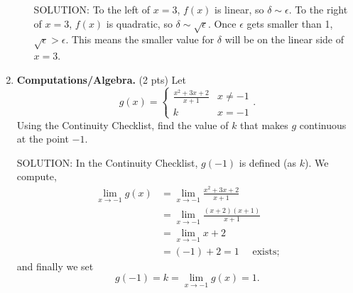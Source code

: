 \documentclass[11pt,letterpaper]{article}
\begin{document}
\begin{enumerate}
\begin{enumerate}
\vspace{0.5pc}
SOLUTION: To the left of $x=3$, $f(x)$ is linear, so $\delta\sim\epsilon$.  To the right of $x=3$, $f(x)$ is quadratic, so $\delta\sim\sqrt\epsilon$.  Once $\epsilon$ gets smaller than 1, $\sqrt\epsilon>\epsilon$.  This means the smaller value for $\delta$ will be on the linear side of $x=3$.
\end{enumerate}

\vspace{1pc}
\item \textbf{Computations/Algebra.} (2 pts) Let 
\[g(x)=\begin{cases}\frac{x^2+3x+2}{x+1} & x\neq -1 \\
	k & x=-1 
    \end{cases}.\]
Using the Continuity Checklist, find the value of $k$ that makes $g$ continuous at the point $-1$.  

\vspace{1pc}
SOLUTION: In the Continuity Checklist, $g(-1)$ is defined (as $k$).  We compute,
\begin{align*}\lim_{x\to -1}g(x) &= \lim_{x\to -1}\frac{x^2+3x+2}{x+1} \\
 &= \lim_{x\to -1}\frac{(x+2)(x+1)}{x+1} \\
 &= \lim_{x\to -1}x+2 \\
 &= (-1)+2 =1\quad\text{ exists;}
\end{align*}
and finally we set
\[g(-1)=k=\lim_{x\to -1}g(x)=1.\]

\end{enumerate}
\end{document}
